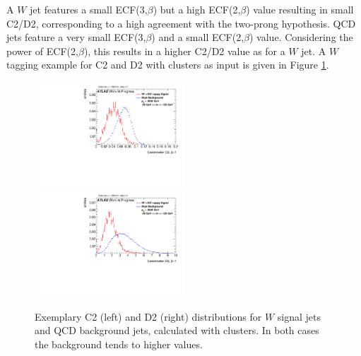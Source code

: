 A $W$ jet features a small ECF(3,$\beta$) but a high ECF(2,$\beta$) value resulting in small C2/D2, corresponding to a high agreement with the two-prong hypothesis. QCD jets feature a very small ECF(3,$\beta$) and a small ECF(2,$\beta$) value. Considering the power of ECF(2,$\beta$), this results in a higher C2/D2 value as for a $W$ jet. A $W$ tagging example for C2 and D2 with clusters as input is given in Figure \ref{fig:ECF_example}.
\begin{figure}
\includegraphics[width=0.5\textwidth]{sascha_input/plots/W/Beta1/h_recoJet_C2_bin6.pdf} \hspace{1mm}
\includegraphics[width=0.5\textwidth]{sascha_input/plots/W/Beta1/h_recoJet_D2_bin6.pdf} 
\caption{Exemplary C2 (left) and D2 (right) distributions for $W$ signal jets and QCD background jets, calculated with clusters. In both cases the background tends to higher values.}\label{fig:ECF_example}
\end{figure}

